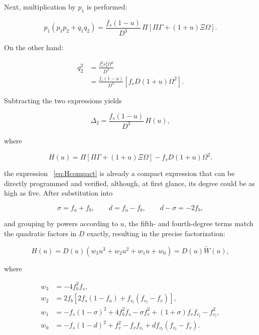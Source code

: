 \documentclass[11pt,a4paper,openany]{book}
\numberwithin{equation}{chapter}
\numberwithin{figure}{chapter}
\numberwithin{table}{chapter}
\begin{document}
Next, multiplication by $p_1$ is performed:

\begin{equation}
p_1(p_1p_2+q_1q_2)
=\frac{f_s(1-u)}{D^3}\,
\Pi\left[\Pi\Gamma+(1+u)\Xi\Omega\right].
\end{equation}

On the other hand:

\begin{align}
q_2^2
&=\frac{f_s^2s_k^2\Omega^2}{D^2}\\
&=\frac{f_s(1-u)}{D^3}
\left[f_sD(1+u)\Omega^2\right].
\end{align}

Subtracting the two expressions yields

\begin{equation}
\Delta_2
=\frac{f_s(1-u)}{D^3}\,H(u),
\label{eq:Delta-H}
\end{equation}

where

\begin{equation}
H(u)=
\Pi\left[\Pi\Gamma+(1+u)\Xi\Omega\right]
-f_sD(1+u)\Omega^2.
\label{eq:Hcompact}
\end{equation}

the expression ~\eqref{eq:Hcompact} is already a compact expression that can be directly programmed and verified, although, at first glance, its degree could be as high as five. After substitution into

\begin{equation}
\sigma=f_a+f_b,
\qquad
d=f_a-f_b,
\qquad
d-\sigma=-2f_b,
\end{equation}

and grouping by powers according to $u$, the fifth- and fourth-degree terms match the quadratic factors in $D$ exactly, resulting in the precise factorization:

\begin{equation}
H(u)=D(u)\left(w_3u^3+w_2u^2+w_1u+w_0\right)
=D(u)\widetilde W(u),
\label{eq:H-factor-W}
\end{equation}

where

\begin{align}
w_3&=-4f_b^2f_s,\\
w_2&=2f_b\left[2f_s(1-f_a)+f_{v_l}(f_{v_l}-f_v)\right],\\
w_1&=-f_s(1-\sigma)^2+4f_b^2f_s-\sigma f_v^2
+(1+\sigma)f_vf_{v_l}-f_{v_l}^2,\\
w_0&=-f_s(1-d)^2+f_v^2-f_vf_{v_l}
+d f_{v_l}(f_{v_l}-f_v).
\label{eq:Wcoeff-full-appendix}
\end{align}
\end{document}
